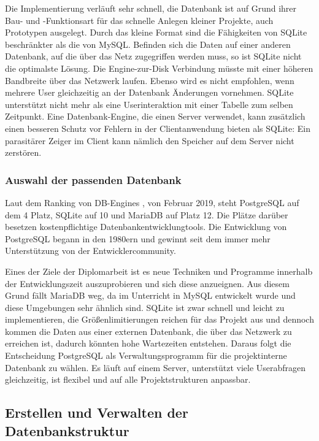 Die Implementierung verläuft sehr schnell, die Datenbank ist auf Grund ihrer Bau- und -Funktionsart für das schnelle Anlegen kleiner Projekte, auch Prototypen ausgelegt. Durch das kleine Format sind die Fähigkeiten von SQLite beschränkter als die von MySQL\cite{SQLiteLimitierungen}. Befinden sich die Daten auf einer anderen Datenbank, auf die über das Netz zugegriffen werden muss, so ist SQLite nicht die optimalste Lösung. Die Engine-zur-Disk Verbindung müsste mit einer höheren Bandbreite über das Netzwerk laufen. Ebenso wird es nicht empfohlen, wenn mehrere User gleichzeitig an der Datenbank Änderungen vornehmen. SQLite unterstützt nicht mehr als eine Userinteraktion mit einer Tabelle zum selben Zeitpunkt. Eine Datenbank-Engine, die einen Server verwendet, kann zusätzlich einen besseren Schutz vor Fehlern in der Clientanwendung bieten als SQLite: Ein parasitärer Zeiger im Client kann nämlich den Speicher auf dem Server nicht zerstören.

\subsubsection{Auswahl der passenden Datenbank} 
Laut dem Ranking von DB-Engines \cite{DBRanking}, von Februar 2019, steht PostgreSQL auf dem 4 Platz, SQLite auf 10 und MariaDB auf Platz 12. Die Plätze darüber besetzen kostenpflichtige Datenbankentwicklungtools. Die Entwicklung von PostgreSQL begann in den 1980ern und gewinnt seit dem immer mehr Unterstützung von der Entwicklercommunity. 

Eines der Ziele der Diplomarbeit ist es neue Techniken und Programme innerhalb der Entwicklungszeit auszuprobieren und sich diese anzueignen. Aus diesem Grund fällt MariaDB weg, da im Unterricht in MySQL entwickelt wurde und diese Umgebungen sehr ähnlich sind. SQLite ist zwar schnell und leicht zu implementieren, die Größenlimitierungen reichen für das Projekt aus und dennoch kommen die Daten aus einer externen Datenbank, die über das Netzwerk zu erreichen ist, dadurch könnten hohe Wartezeiten entstehen. Daraus folgt die Entscheidung PostgreSQL als Verwaltungsprogramm für die projektinterne Datenbank zu wählen. Es läuft auf einem Server, unterstützt viele Userabfragen gleichzeitig, ist flexibel und auf alle Projektstrukturen anpassbar. 

\subsection{Erstellen und Verwalten der Datenbankstruktur}

